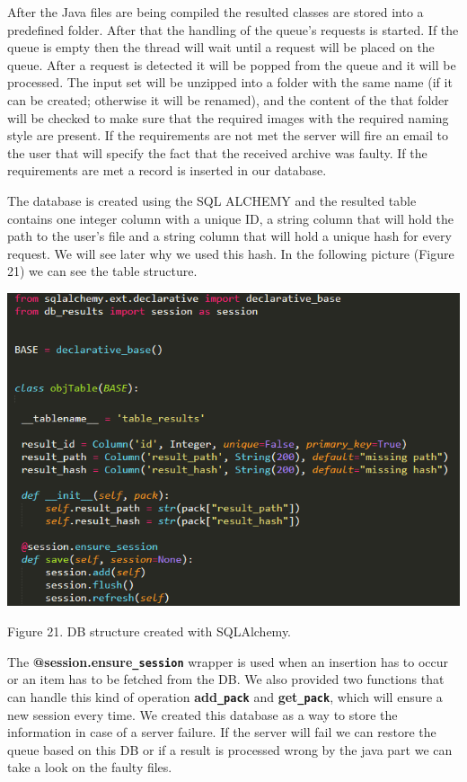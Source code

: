 \documentclass[12pt, a4paper]{report}
\begin{document}
After the Java files are being compiled the resulted classes are stored into a predefined folder. After that the handling of the queue's requests is started. If the queue is empty then the thread will wait until a request will be placed on the queue. After a request is detected it will be popped from the queue and it will be processed. The input set will be unzipped into a folder with the same name (if it can be created; otherwise it will be renamed), and the content of the that folder will be checked to make sure that the required images with the required naming style are present. If the requirements are not met the server will fire an email to the user that will specify the fact that the received archive was faulty. If the requirements are met a record is inserted in our database.
\par 

The database is created using the SQL ALCHEMY and the resulted table contains one integer column with a unique ID, a string column that will hold the path to the user's file and a string column that will hold a unique hash for every request. We will see later why we used this hash. In the following picture (Figure 21) we can see the table structure.
\par

\medskip
\includegraphics[scale=0.9, right]{database_table.png}
\begin{center}
Figure 21. DB structure created with SQLAlchemy.
\end{center}
\par 

The \textbf{@session.ensure\texttt{\_session}} wrapper is used when an insertion has to occur or an item has to be fetched from the DB. We also provided two functions that can handle this kind of operation \textbf{add\texttt{\_pack}} and \textbf{get\texttt{\_pack}}, which will ensure a new session every time. We created this database as a way to store the information in case of a server failure. If the server will fail we can restore the queue based on this DB or if a result is processed wrong by the java part we can take a look on the faulty files.
\par 
\end{document}
